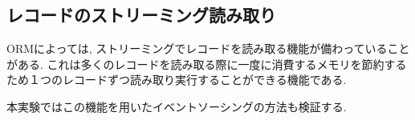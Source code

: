\documentclass[../../../main]{subfiles}
\begin{document}
    \subsection{レコードのストリーミング読み取り}\label{subsec:phraseology-record_streaming_read}

    ORMによっては, ストリーミングでレコードを読み取る機能が備わっていることがある. これは多くのレコードを読み取る際に一度に消費するメモリを節約するため１つのレコードずつ読み取り実行することができる機能である.\cite{FluentQuery}

    本実験ではこの機能を用いたイベントソーシングの方法も検証する.
\end{document}
